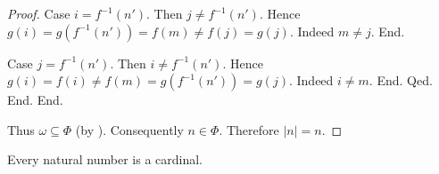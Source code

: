 \documentclass[10pt]{article}
\begin{document}
\begin{forthel}
\begin{proof}
            Case $i = f^{-1}(n')$.
              Then $j \neq f^{-1}(n')$.
              Hence $g(i)
                = g(f^{-1}(n'))
                = f(m)
                \neq f(j)
                = g(j)$.
              Indeed $m \neq j$.
            End.

            Case $j = f^{-1}(n')$.
              Then $i \neq f^{-1}(n')$.
              Hence $g(i)
                = f(i)
                \neq f(m)
                = g(f^{-1}(n'))
                = g(j)$.
              Indeed $i \neq m$.
            End.
          Qed.
        End.
      End.

      Thus $\omega \subseteq \Phi$ (by ).
      Consequently $n \in \Phi$.
      Therefore $|n| = n$.
    \end{proof}
  \end{forthel}

  \begin{forthel}
    \begin{corollary}[id=SET_THEORY_07_7061392098066432,printid]
      Every natural number is a cardinal.
    \end{corollary}
  \end{forthel}
\end{document}
